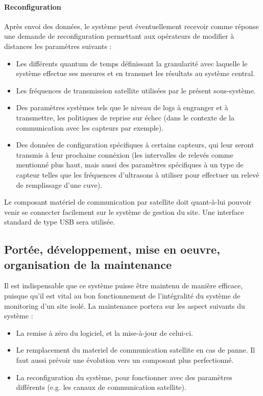 \paragraph{Reconfiguration} Après envoi des données, le système peut éventuellement recevoir comme réponse une demande de reconfiguration permettant aux opérateurs de modifier à distances les paramètres suivants :

\begin{itemize}
\item Les différents quantum de temps définissant la granularité avec laquelle le système effectue ses mesures et en transmet les résultats au système central.
\item Les fréquences de transmission satellite utilisées par le présent sous-système.
\item Des paramètres systèmes tels que le niveau de logs à engranger et à transmettre, les politiques de reprise sur échec (dans le contexte de la communication avec les capteurs par exemple).
\item Des données de configuration spécifiques à certains capteurs, qui leur seront transmis à leur prochaine connéxion (les intervalles de relevés comme mentionné plus haut, mais aussi des paramètres spécifiques à un type de capteur telles que les fréquences d'ultrasons à utiliser pour effectuer un relevé de remplissage d'une cuve).
\end{itemize}

Le composant matériel de communication par satellite doit quant-à-lui pouvoir venir se connecter facilement sur le système de gestion du site. Une interface standard de type USB sera utilisée.

\subsection{Portée, développement, mise en oeuvre, organisation de la maintenance}

Il est indispensable que ce système puisse être maintenu de manière efficace, puisque qu'il est vital au bon fonctionnement de l'intégralité du système de monitoring d'un site isolé. La maintenance portera sur les aspect suivants du système :

\begin{itemize}
\item La remise à zéro du logiciel, et la mise-à-jour de celui-ci.
\item Le remplacement du materiel de communication satellite en cas de panne. Il faut aussi prévoir une évolution vers un composant plus perfectionné.\footnotemark
\item La reconfiguration du système, pour fonctionner avec des paramètres différents (e.g. les canaux de communication satellite).
\end{itemize}

